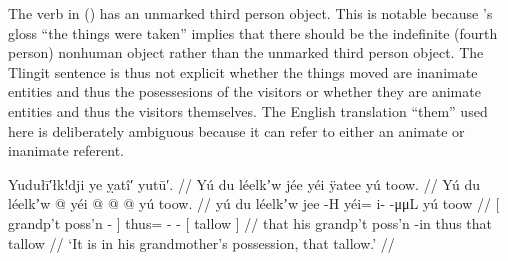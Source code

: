 The verb in (\lastx) has an unmarked third person object.
This is notable because \citeauthor{swanton:1909}’s gloss “the things were taken” implies that there should be the indefinite (fourth person) nonhuman object  rather than the unmarked third person object.
The Tlingit sentence is thus not explicit whether the things moved are inanimate entities and thus the posessesions of the visitors or whether they are animate entities and thus the visitors themselves.
The English translation “them” used here is deliberately ambiguous because it can refer to either an animate or inanimate referent.

\ex\label{ex:92-8-his-grandmother-has-the-tallow}%
\begingl
	\glpreamble	Yudułī′łk!dji ye ỵatî′ yutū′. //
	\glpreamble	Yú du léelkʼw jée yéi ÿatee yú toow. //
	\gla	{} Yú du léelkʼw  @ {} {}
		yéi @  @ {} @ {}
		{} yú toow. {} //
	\glb	{} yú du léelkʼw jee -H {}
		yéi= i-  -μμL
		{} yú toow {} //
	\glc	{}[   grandp’t poss’n - {}]
		thus= -  -
		{}[  tallow {}] //
	\gld	{} that his grandp’t poss’n -in {}
		thus  {} {}
		{} that tallow {} //
	\glft	‘It is in his grandmother’s possession, that tallow.’
		//
\endgl%
\xe

